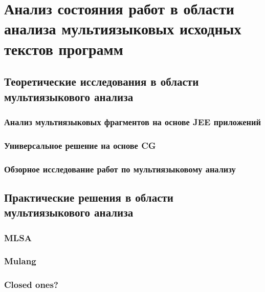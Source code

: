 \section{Анализ состояния работ в области анализа мультиязыковых исходных текстов программ}

\subsection{Теоретические исследования в области мультиязыкового анализа}

\subsubsection{Анализ мультиязыковых фрагментов на основе JEE приложений}

\subsubsection{Универсальное решение на основе CG}

\subsubsection{Обзорное исследование работ по мультиязыковому анализу}


\subsection{Практические решения в области мультиязыкового анализа}

\subsubsection{MLSA}

\subsubsection{Mulang}

\subsubsection{Closed ones?}

\clearpage